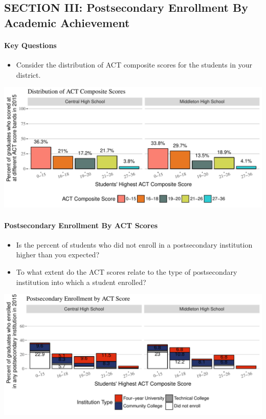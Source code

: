 \documentclass[11pt,]{article}
\providecommand{\tightlist}{%
  \setlength{\itemsep}{0pt}\setlength{\parskip}{0pt}}
\let\oldparagraph\paragraph
\renewcommand{\paragraph}[1]{\oldparagraph{#1}\mbox{}}
\begin{document}
\newpage

\subsection{SECTION III: Postsecondary Enrollment By Academic
Achievement}\label{section-iii-postsecondary-enrollment-by-academic-achievement}

\paragraph{Key Questions}\label{key-questions}

\begin{itemize}
\tightlist
\item
  Consider the distribution of ACT composite scores for the students in
  your district.\\
   
\end{itemize}

\includegraphics{20170424_PSWRR_files/figure-latex/ACT_distribution-1.pdf}

\paragraph{Postsecondary Enrollment By ACT
Scores}\label{postsecondary-enrollment-by-act-scores}

\begin{itemize}
\tightlist
\item
  Is the percent of students who did not enroll in a postsecondary
  institution higher than you expected?
\item
  To what extent do the ACT scores relate to the type of postsecondary
  institution into which a student enrolled?
\end{itemize}

\includegraphics{20170424_PSWRR_files/figure-latex/Figure7a-1.pdf}
\end{document}
